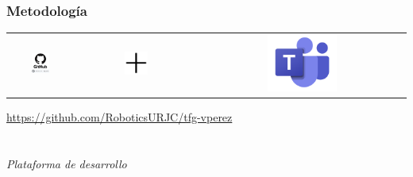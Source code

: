 \documentclass{beamer}
\begin{document}
\begin{frame}
\frametitle{Metodología}
\begin{table}[htbp]
  \centering
  \begin{tabular}{ccc}
      \includegraphics[width=0.3\textwidth, valign=m]{figs/repo.png} & \includegraphics[width=0.2\textwidth, valign=m]{figs/plus.png} & \includegraphics[width=0.35\textwidth, valign=m]{figs/teams.png} 
  \end{tabular}
\end{table}
\begin{center}
  \url{https://github.com/RoboticsURJC/tfg-vperez}
\end{center}

\end{frame}

\section*{}
\begin{frame}{}
  \centering \Huge
  \emph{Plataforma de desarrollo}
\end{frame}
\end{document}
